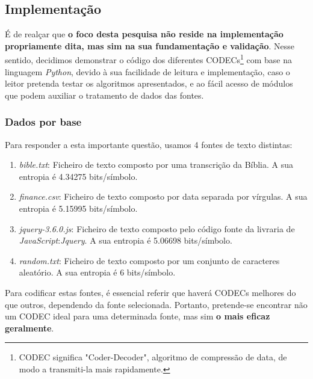 \documentclass[10pt,journal,compsoc]{IEEEtran}
\begin{document}
    
    \subsection{Implementação}
    
    
    É de realçar que \textbf{o foco desta pesquisa não reside na implementação propriamente dita, mas sim na sua fundamentação e validação}. Nesse sentido, decidimos demonstrar o código dos diferentes CODECs\footnote{CODEC significa "Coder-Decoder", algoritmo de compressão de data, de modo a transmiti-la mais rapidamente.} com base na linguagem \textit{Python}, devido à sua facilidade de leitura e implementação, caso o leitor pretenda testar os algoritmos apresentados, e ao fácil acesso de módulos que podem auxiliar o tratamento de dados das fontes.
    
    \IEEEpubidadjcol
    
    \subsubsection{Dados por base}
    Para responder a esta importante questão, usamos 4 fontes de texto distintas:
    \begin{enumerate}
        \item \textit{bible.txt}: Ficheiro de texto composto por uma transcrição da Bíblia. A sua entropia é 4.34275 bits/símbolo.
        \item \textit{finance.csv}: Ficheiro de texto composto por data separada por vírgulas. A sua entropia é 5.15995 bits/símbolo.
        \item \textit{jquery-3.6.0.js}: Ficheiro de texto composto pelo código fonte da livraria de \textit{JavaScript}:\textit{Jquery}. A sua entropia é 5.06698 bits/símbolo.
        \item \textit{random.txt}: Ficheiro de texto composto por um conjunto de caracteres aleatório. A sua entropia é 6 bits/símbolo.
    \end{enumerate}
    
    Para codificar estas fontes, é essencial referir que haverá CODECs melhores do que outros, dependendo da fonte selecionada. Portanto, pretende-se encontrar não um CODEC ideal para uma determinada fonte, mas sim \textbf{o mais eficaz geralmente}. 
    
\end{document}
